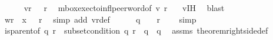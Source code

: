 \begin{isabellebody}
\ \ \ \ \isamarkupfalse%
\ {\isachardoublequoteopen}{\isacharparenleft}{\kern0pt}{\isacharparenleft}{\kern0pt}{\isacharquery}{\kern0pt}v{\isacharprime}{\kern0pt}{\isacharparenright}{\kern0pt}{\isasymdown}\isactrlsub r{\isacharparenright}{\kern0pt}\ {\isasymin}\ {\isasymL}\isactrlsup {\isacharasterisk}{\kern0pt}\ r{\isachardoublequoteclose}\ \isamarkupfalse%
\ mbox{\isacharunderscore}{\kern0pt}exec{\isacharunderscore}{\kern0pt}to{\isacharunderscore}{\kern0pt}infl{\isacharunderscore}{\kern0pt}peer{\isacharunderscore}{\kern0pt}word{\isacharbrackleft}{\kern0pt}of\ {\isachardoublequoteopen}{\isacharquery}{\kern0pt}v{\isacharprime}{\kern0pt}{\isachardoublequoteclose}\ r{\isacharbrackright}{\kern0pt}\ \ \isamarkupfalse%
\ v{\isacharunderscore}{\kern0pt}IH\ \isamarkupfalse%
\ blast\isanewline
\ \ \ \ \isamarkupfalse%
\ \isamarkupfalse%
\ {\isachardoublequoteopen}wr{\isacharprime}{\kern0pt}\ {\isasymsqdot}\ x{\isacharprime}{\kern0pt}\ {\isasymin}\ {\isasymL}\isactrlsup {\isacharasterisk}{\kern0pt}\ r{\isachardoublequoteclose}\ \isamarkupfalse%
\ {\isacharparenleft}{\kern0pt}simp\ add{\isacharcolon}{\kern0pt}\ v{\isacharprime}{\kern0pt}r{\isacharunderscore}{\kern0pt}def{\isacharparenright}{\kern0pt}\isanewline
\isanewline
\ \ \ \ \isamarkupfalse%
\ {\isachardoublequoteopen}q\ {\isasymin}\ {\isasymP}\ {\isasymand}\ r\ {\isasymin}\ {\isasymP}{\isachardoublequoteclose}\ \isamarkupfalse%
\ simp\ \isanewline
\ \ \ \ \isamarkupfalse%
\ \isamarkupfalse%
\ {\isachardoublequoteopen}{\isacharparenleft}{\kern0pt}is{\isacharunderscore}{\kern0pt}parent{\isacharunderscore}{\kern0pt}of\ q\ r{\isacharparenright}{\kern0pt}\ {\isasymlongrightarrow}\ {\isacharparenleft}{\kern0pt}{\isacharparenleft}{\kern0pt}subset{\isacharunderscore}{\kern0pt}condition\ q\ r{\isacharparenright}{\kern0pt}\ {\isasymand}\ {\isacharparenleft}{\kern0pt}{\isacharparenleft}{\kern0pt}{\isasymL}\isactrlsup {\isacharasterisk}{\kern0pt}{\isacharparenleft}{\kern0pt}q{\isacharparenright}{\kern0pt}{\isacharparenright}{\kern0pt}\ {\isacharequal}{\kern0pt}\ {\isacharparenleft}{\kern0pt}{\isasymL}\isactrlsup {\isacharasterisk}{\kern0pt}\isactrlsub {\isasymsqunion}\isactrlsub {\isasymsqunion}{\isacharparenleft}{\kern0pt}q{\isacharparenright}{\kern0pt}{\isacharparenright}{\kern0pt}{\isacharparenright}{\kern0pt}{\isacharparenright}{\kern0pt}{\isachardoublequoteclose}\ \isamarkupfalse%
\ assms{\isacharparenleft}{\kern0pt}{}{\isacharparenright}{\kern0pt}\ theorem{\isacharunderscore}{\kern0pt}rightside{\isacharunderscore}{\kern0pt}def\ \isamarkupfalse%

\end{isabellebody}
